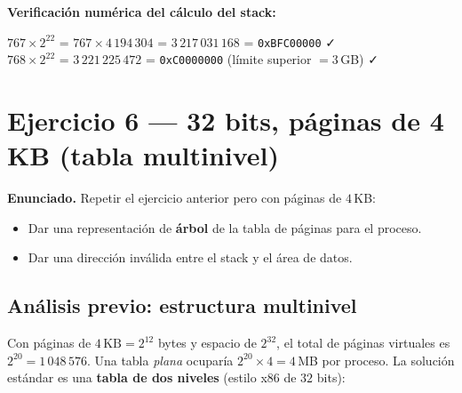 \documentclass[11pt,a4paper]{article}
\begin{document}
\textbf{Verificación numérica del cálculo del stack:}

\quad $767 \times 2^{22}$ = $767 \times 4\,194\,304$ = $3\,217\,031\,168$ = \texttt{0xBFC00000} ✓ \\
\quad $768 \times 2^{22}$ = $3\,221\,225\,472$ = \texttt{0xC0000000} (límite superior $= 3$\,GB) ✓

\section{Ejercicio 6 --- 32 bits, páginas de 4 KB (tabla multinivel)}

\textbf{Enunciado.} Repetir el ejercicio anterior pero con páginas de
$4$\,KB:

\begin{itemize}[leftmargin=*,nosep]
    \item[(a)] Dar una representación de \textbf{árbol} de la tabla de
        páginas para el proceso.
    \item[(b)] Dar una dirección inválida entre el stack y el área de
        datos.
\end{itemize}

\subsection{Análisis previo: estructura multinivel}

Con páginas de $4\,\text{KB} = 2^{12}$ bytes y espacio de $2^{32}$, el
total de páginas virtuales es $2^{20} = 1\,048\,576$. Una tabla
\emph{plana} ocuparía $2^{20} \times 4 = 4$\,MB por proceso. La
solución estándar es una \textbf{tabla de dos niveles} (estilo x86 de
$32$ bits):

\begin{center}
\end{center}
\end{document}
